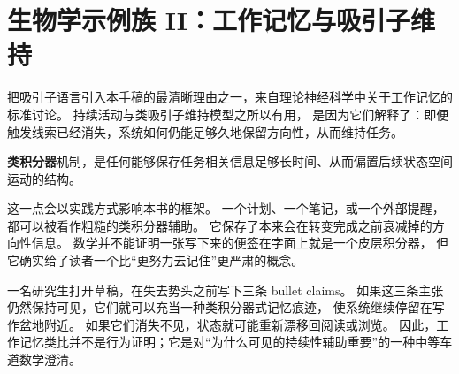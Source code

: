 \section{生物学示例族 II：工作记忆与吸引子维持}

把吸引子语言引入本手稿的最清晰理由之一，来自理论神经科学中关于工作记忆的标准讨论。
持续活动与类吸引子维持模型之所以有用，
是因为它们解释了：即便触发线索已经消失，系统如何仍能足够久地保留方向性，从而维持任务。

\begin{definition}[类积分器持续性]
\textbf{类积分器}机制，是任何能够保存任务相关信息足够长时间、从而偏置后续状态空间运动的结构。
\end{definition}

\begin{discussion}
这一点会以实践方式影响本书的框架。
一个计划、一个笔记，或一个外部提醒，都可以被看作粗糙的类积分器辅助。
它保存了本来会在转变完成之前衰减掉的方向性信息。
数学并不能证明一张写下来的便签在字面上就是一个皮层积分器，
但它确实给了读者一个比“更努力去记住”更严肃的概念。
\end{discussion}

\begin{example}[写作场景中的维持]
一名研究生打开草稿，在失去势头之前写下三条 bullet claims。
如果这三条主张仍然保持可见，它们就可以充当一种类积分器式记忆痕迹，
使系统继续停留在写作盆地附近。
如果它们消失不见，状态就可能重新漂移回阅读或浏览。
因此，工作记忆类比并不是行为证明；它是对“为什么可见的持续性辅助重要”的一种中等车道数学澄清。
\end{example}